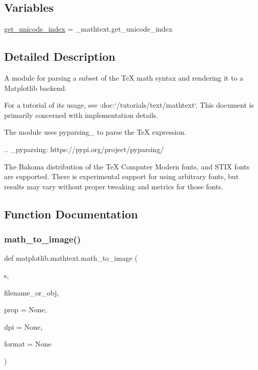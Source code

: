\subsection*{Variables}
\begin{DoxyCompactItemize}
\item 
\hyperlink{namespacematplotlib_1_1mathtext_adfdb95794ad7f1c39fc7a443ef1a9e24}{get\+\_\+unicode\+\_\+index} = \+\_\+mathtext.\+get\+\_\+unicode\+\_\+index
\end{DoxyCompactItemize}


\subsection{Detailed Description}
\begin{DoxyVerb}A module for parsing a subset of the TeX math syntax and rendering it to a
Matplotlib backend.

For a tutorial of its usage, see :doc:`/tutorials/text/mathtext`.  This
document is primarily concerned with implementation details.

The module uses pyparsing_ to parse the TeX expression.

.. _pyparsing: https://pypi.org/project/pyparsing/

The Bakoma distribution of the TeX Computer Modern fonts, and STIX
fonts are supported.  There is experimental support for using
arbitrary fonts, but results may vary without proper tweaking and
metrics for those fonts.
\end{DoxyVerb}
 

\subsection{Function Documentation}
\mbox{\label{namespacematplotlib_1_1mathtext_ae8a4548aa1fd9ca4572dba4a1aea17ae}} 
\subsubsection{\texorpdfstring{math\+\_\+to\+\_\+image()}{math\_to\_image()}}
{\footnotesize\ttfamily def matplotlib.\+mathtext.\+math\+\_\+to\+\_\+image (\begin{DoxyParamCaption}\item[{}]{s,  }\item[{}]{filename\+\_\+or\+\_\+obj,  }\item[{}]{prop = {\ttfamily None},  }\item[{}]{dpi = {\ttfamily None},  }\item[{}]{format = {\ttfamily None} }\end{DoxyParamCaption})}

